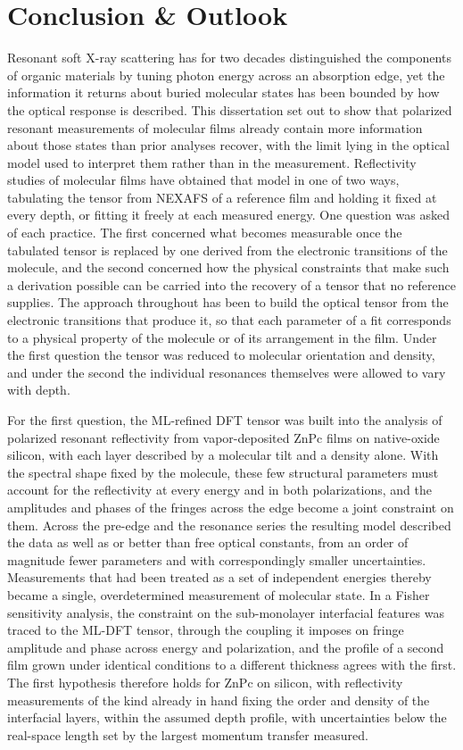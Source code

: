\chapter{Conclusion \& Outlook}\label{chap:conclusion}

Resonant soft X-ray scattering has for two decades distinguished the components of organic materials by tuning photon energy across an absorption edge, yet the information it returns about buried molecular states has been bounded by how the optical response is described. This dissertation set out to show that polarized resonant measurements of molecular films already contain more information about those states than prior analyses recover, with the limit lying in the optical model used to interpret them rather than in the measurement. Reflectivity studies of molecular films have obtained that model in one of two ways, tabulating the tensor from NEXAFS of a reference film and holding it fixed at every depth, or fitting it freely at each measured energy. One question was asked of each practice. The first concerned what becomes measurable once the tabulated tensor is replaced by one derived from the electronic transitions of the molecule, and the second concerned how the physical constraints that make such a derivation possible can be carried into the recovery of a tensor that no reference supplies. The approach throughout has been to build the optical tensor from the electronic transitions that produce it, so that each parameter of a fit corresponds to a physical property of the molecule or of its arrangement in the film. Under the first question the tensor was reduced to molecular orientation and density, and under the second the individual resonances themselves were allowed to vary with depth.

For the first question, the ML-refined DFT tensor was built into the analysis of polarized resonant reflectivity from vapor-deposited ZnPc films on native-oxide silicon, with each layer described by a molecular tilt and a density alone. With the spectral shape fixed by the molecule, these few structural parameters must account for the reflectivity at every energy and in both polarizations, and the amplitudes and phases of the fringes across the edge become a joint constraint on them. Across the pre-edge and the resonance series the resulting model described the data as well as or better than free optical constants, from an order of magnitude fewer parameters and with correspondingly smaller uncertainties. Measurements that had been treated as a set of independent energies thereby became a single, overdetermined measurement of molecular state. In a Fisher sensitivity analysis, the constraint on the sub-monolayer interfacial features was traced to the ML-DFT tensor, through the coupling it imposes on fringe amplitude and phase across energy and polarization, and the profile of a second film grown under identical conditions to a different thickness agrees with the first. The first hypothesis therefore holds for ZnPc on silicon, with reflectivity measurements of the kind already in hand fixing the order and density of the interfacial layers, within the assumed depth profile, with uncertainties below the real-space length set by the largest momentum transfer measured.


